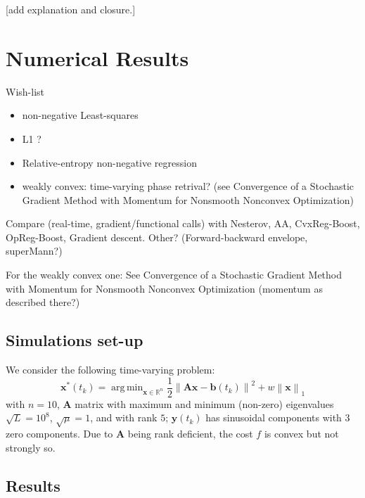 \documentclass{article}
\DeclareMathOperator*{\argmin}{arg\,min}
\newcommand{\norm}[1]{\left\lVert#1\right\rVert}
\newcommand{\R}{\mathbb{R}}
\newcommand{\bv}{\mathbold{b}}
\newcommand{\x}{\mathbold{x}}
\newcommand{\y}{\mathbold{y}}
\newcommand{\Am}{\mathbold{A}}
\newcommand{\andrea}[1]{{\color{red}[#1]}}
\begin{document}
\andrea{add explanation and closure.}



\section{Numerical Results}\label{sec:numerical}

Wish-list

\begin{itemize}
\item non-negative Least-squares

\item L1 ? 

\item Relative-entropy non-negative regression

\item weakly convex: time-varying phase retrival? (see Convergence of a Stochastic Gradient Method with Momentum for Nonsmooth Nonconvex Optimization)

\end{itemize}

Compare (real-time, gradient/functional calls) with Nesterov, AA, CvxReg-Boost, OpReg-Boost, Gradient descent. Other? (Forward-backward envelope, superMann?)

For the weakly convex one: See Convergence of a Stochastic Gradient Method with Momentum for Nonsmooth Nonconvex Optimization (momentum as described there?)



\subsection{Simulations set-up}
We consider the following time-varying problem:
\begin{equation}\label{eq:tv-problem}
	\x^*(t_k) = \argmin_{\x \in \R^n} \frac{1}{2} \norm{\Am \x - \bv(t_k)}^2 + w \norm{\x}_1
\end{equation}
with $n = 10$, $\Am$ matrix with maximum and minimum (non-zero) eigenvalues $\sqrt{L} = 10^8$, $\sqrt{\mu} = 1$, and with rank $5$; $\y(t_k)$ has sinusoidal components with $3$ zero components. Due to $\Am$ being rank deficient, the cost $f$ is convex but not strongly so.


\subsection{Results}
\end{document}
